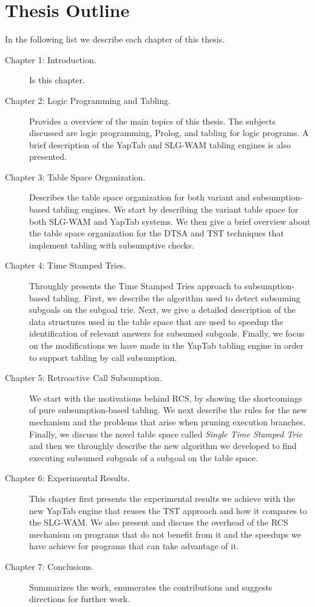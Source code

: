 \section{Thesis Outline}

In the following list we describe each chapter of this thesis.

\begin{description}

   \item[Chapter 1: Introduction.] Is this chapter.
   
   \item[Chapter 2: Logic Programming and Tabling.] Provides a overview of the main topics of this thesis.
   The subjects discussed are logic programming, Prolog, and tabling for logic programs. A brief description
   of the YapTab and SLG-WAM tabling engines is also presented.
   
   \item[Chapter 3: Table Space Organization.] Describes the table space organization for both variant and
   subsumption-based tabling engines. We start by describing the variant table space for both SLG-WAM and
   YapTab systems. We then give a brief overview about the table space organization for the DTSA and TST
   techniques that implement tabling with subsumptive checks.
   
   \item[Chapter 4: Time Stamped Tries.] Throughly presents the Time Stamped Tries approach to subsumption-based
   tabling. First, we describe the algorithm used to detect subsuming subgoals on the subgoal trie. Next,
   we give a detailed description of the data structures used in the table space that are used to speedup
   the identification of relevant answers for subsumed subgoals. Finally, we focus on the modifications we have
   made in the YapTab tabling engine in order to support tabling by call subsumption.
   
   \item[Chapter 5: Retroactive Call Subsumption.] We start with the motivations behind RCS, by showing the shortcomings
   of pure subsumption-based tabling. We next describe the rules for the new mechanism and the problems that arise
   when pruning execution branches. Finally, we discuss the novel table space called \emph{Single Time Stamped Trie}
   and then we throughly describe the new algorithm we developed to find executing subsumed subgoals of a subgoal on the
   table space.
   
   \item[Chapter 6: Experimental Results.] This chapter first presents the experimental results we achieve with
   the new YapTab engine that reuses the TST approach and how it compares to the SLG-WAM. We also present and
   discuss the overhead of the RCS mechanism on programs that do not benefit from it and the speedups we have
   achieve for programs that can take advantage of it.
   
   \item[Chapter 7: Conclusions.] Summarizes the work, enumerates the contributions and suggests directions for
   further work.
   
\end{description}
